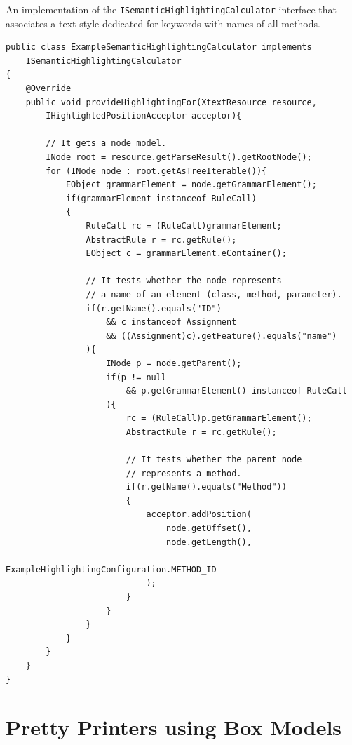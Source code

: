 \documentclass[12pt,notitlepage,a4paper]{report}
\begin{document}
\begin{expl}\label{SemanticHighlightingExample}
An implementation of the \texttt{ISemanticHighlightingCalculator} interface that associates a text style dedicated for keywords with names of all methods.
\begingroup
\fontsize{10pt}{12pt}
\begin{verbatim}
public class ExampleSemanticHighlightingCalculator implements
    ISemanticHighlightingCalculator
{
    @Override
    public void provideHighlightingFor(XtextResource resource,
        IHighlightedPositionAcceptor acceptor){

        // It gets a node model.
        INode root = resource.getParseResult().getRootNode();
        for (INode node : root.getAsTreeIterable()){   
            EObject grammarElement = node.getGrammarElement(); 
            if(grammarElement instanceof RuleCall)
            {
                RuleCall rc = (RuleCall)grammarElement;
                AbstractRule r = rc.getRule();
                EObject c = grammarElement.eContainer();
			   
                // It tests whether the node represents 
                // a name of an element (class, method, parameter).
                if(r.getName().equals("ID")
                    && c instanceof Assignment 
                    && ((Assignment)c).getFeature().equals("name")
                ){
                    INode p = node.getParent();
                    if(p != null 
                        && p.getGrammarElement() instanceof RuleCall
                    ){
                        rc = (RuleCall)p.getGrammarElement();
                        AbstractRule r = rc.getRule();
			   
                        // It tests whether the parent node
                        // represents a method.                        
                        if(r.getName().equals("Method"))
                        {
                            acceptor.addPosition(
                                node.getOffset(),
                                node.getLength(),
                                ExampleHighlightingConfiguration.METHOD_ID
                            );
                        }
                    }
                }
            }
        }
    }
}
\end{verbatim}
\endgroup
\end{expl}

\chapter {Pretty Printers using Box Models}
\end{document}
